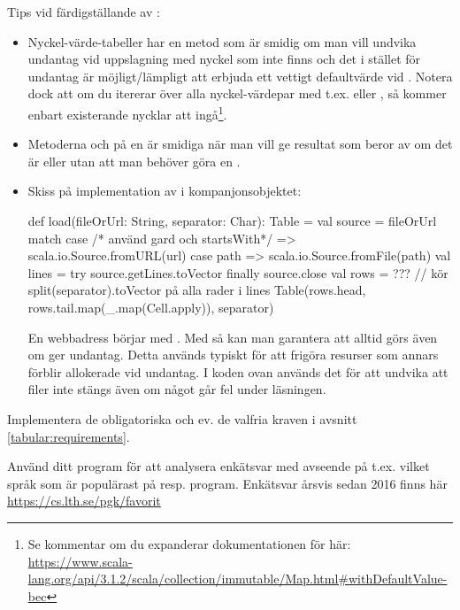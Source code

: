 \noindent Tips vid färdigställande av :
\begin{itemize}[leftmargin=*]
  \item Nyckel-värde-tabeller har en metod  som är smidig om man vill undvika undantag vid uppslagning med nyckel som inte finns och det i stället för undantag är möjligt/lämpligt att erbjuda ett vettigt defaultvärde vid . Notera dock att om du itererar över alla nyckel-värdepar med t.ex.  eller , så kommer enbart existerande nycklar att ingå\footnote{Se kommentar om du expanderar dokumentationen för  här: \url{https://www.scala-lang.org/api/3.1.2/scala/collection/immutable/Map.html\#withDefaultValue-bec}}.
  \item Metoderna  och  på en  är smidiga när man vill ge resultat som beror av om det är  eller  utan att man behöver göra en .
\item Skiss på implementation av  i kompanjonsobjektet:
\begin{CodeSmall}
def load(fileOrUrl: String, separator: Char): Table = {
  val source = fileOrUrl match {
    case /* använd gard och startsWith*/ => scala.io.Source.fromURL(url)
    case path  => scala.io.Source.fromFile(path)
  }
  val lines = try source.getLines.toVector finally source.close
  val rows = ??? // kör split(separator).toVector på alla rader i lines
  Table(rows.head, rows.tail.map(_.map(Cell.apply)), separator)
}
\end{CodeSmall}
En webbadress börjar med .
Med  så kan man garantera att  alltid görs även om  ger undantag. Detta används typiskt för att frigöra resurser som annars förblir allokerade vid undantag. I koden ovan används det för att undvika att filer inte stängs även om något går fel under läsningen.
\end{itemize}

\Task Implementera de obligatoriska och ev. de valfria kraven i avsnitt \ref{tabular:requirements}.

\Task Använd ditt program för att analysera enkätsvar med avseende på t.ex. vilket språk som är populärast på resp. program. Enkätsvar årsvis sedan 2016 finns här \url{https://cs.lth.se/pgk/favorit}

